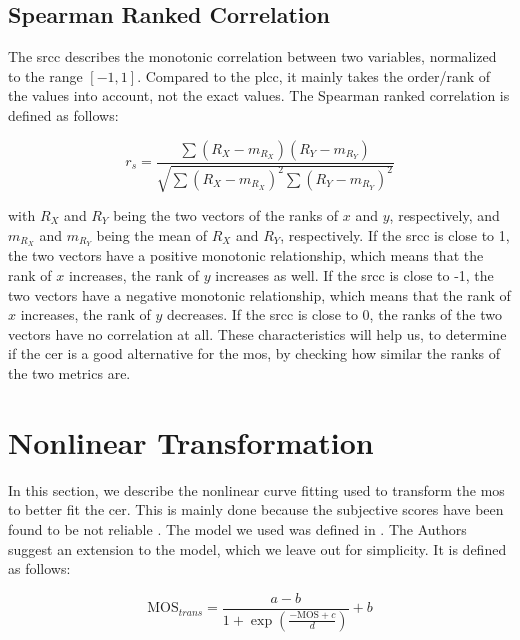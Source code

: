 \subsection{Spearman Ranked Correlation}
\label{subsec:spearman}

The \gls{srcc} \cite{pears_spear_2016} describes the monotonic correlation between two variables, normalized to the range \([-1, 1]\).
Compared to the \gls{plcc}, it mainly takes the order/rank of the values into account, not the exact values.
The Spearman ranked correlation is defined as follows:

\begin{equation}
    r_s = \frac{\sum{(R_X-m_{R_X})(R_Y-m_{R_Y})}}{\sqrt{\sum{(R_X-m_{R_X})^2}\sum{(R_Y-m_{R_Y})^2}}}
    \label{eq:spearman}
\end{equation}

with \(R_X\) and \(R_Y\) being the two vectors of the ranks of \(x\) and \(y\), respectively, and \(m_{R_X}\) and \(m_{R_Y}\) being the mean of \(R_X\) and \(R_Y\), respectively.
If the \gls{srcc} is close to 1, the two vectors have a positive monotonic relationship, which means that the rank of \(x\) increases, the rank of \(y\) increases as well.
If the \gls{srcc} is close to -1, the two vectors have a negative monotonic relationship, which means that the rank of \(x\) increases, the rank of \(y\) decreases.
If the \gls{srcc} is close to 0, the ranks of the two vectors have no correlation at all.
These characteristics will help us, to determine if the \gls{cer} is a good alternative for the \gls{mos}, by checking how similar the ranks of the two metrics are.

\section{Nonlinear Transformation}
\label{sec:nonlinear}

In this section, we describe the nonlinear curve fitting used to transform the \gls{mos} to better fit the \gls{cer}.
This is mainly done because the subjective scores have been found to be not reliable \cite{nonlin_fit_original_2000}.
The model we used was defined in \cite{nonlin_fit_original_2000}.
The Authors suggest an extension to the model, which we leave out for simplicity.
It is defined as follows:

\begin{equation}
    \text{MOS}_{trans} = \frac{a - b}{1 + \exp \left( \frac{-\text{MOS} + c}{d} \right)} + b
    \label{eq:nonlinear}
\end{equation}
    
